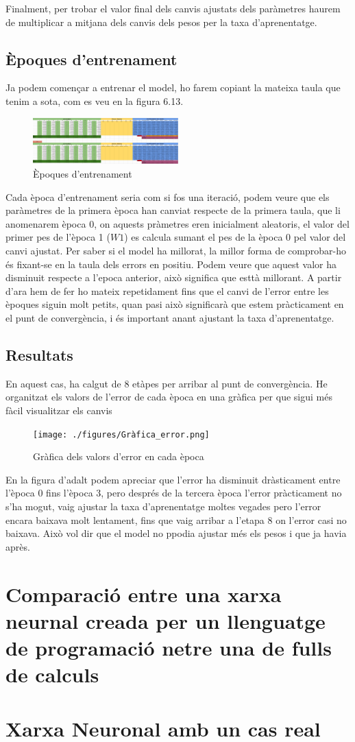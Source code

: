 Finalment, per trobar el valor final dels canvis ajustats dels paràmetres haurem de multiplicar a mitjana dels canvis dels pesos per la taxa d'aprenentatge.
\subsection{Èpoques d'entrenament}
Ja podem començar a entrenar el model, ho farem copiant la mateixa taula que tenim a sota, com es veu en la figura 6.13.

\begin{figure}[H]
    \centering
    \includegraphics[width=0.5\textwidth]{./figures/Etapa_1.png}
    \caption{Èpoques d'entrenament}
\end{figure}

Cada època d'entrenament seria com si fos una iteració, podem veure que els paràmetres de la primera època han canviat respecte de la primera taula, que li anomenarem època 0, on aquests pràmetres eren inicialment aleatoris, el valor del primer pes de l'època 1 ($W1$) es calcula sumant el pes de la època 0 pel valor del canvi ajustat.
Per saber si el model ha millorat, la millor forma de comprobar-ho és fixant-se en la taula dels errors en positiu. Podem veure que aquest valor ha disminuit respecte a l'epoca anterior, això significa que esttà millorant.
A partir d'ara hem de fer ho mateix repetidament fins que el canvi de l'error entre les èpoques siguin molt petits, quan pasi això significarà que estem pràcticament en el punt de convergència, i és important anant ajustant la taxa d'aprenentatge.
\subsection{Resultats}
En aquest cas, ha calgut de 8 etàpes per arribar al punt de convergència. He organitzat els valors de l'error de cada època en una gràfica per que sigui més fàcil visualitzar els canvis

\begin{figure}[H]
    \centering
    \texttt{[image: ./figures/Gràfica\_error.png]}
    \caption{Gràfica dels valors d'error en cada època}
\end{figure}

En la figura d'adalt podem apreciar que l'error ha disminuit dràsticament entre l'època 0 fins l'època 3, pero després de la tercera època l'error pràcticament no s'ha mogut, vaig ajustar la taxa d'aprenentatge moltes vegades pero l'error encara baixava molt lentament, fins que vaig arribar a l'etapa 8 on l'error casi no baixava. Això vol dir que el model no ppodia ajustar més els pesos i que ja havia après.

\section{Comparació entre una xarxa neurnal creada per un llenguatge de programació netre una de fulls de calculs}

\section{Xarxa Neuronal amb un cas real}\label{sec:12}
